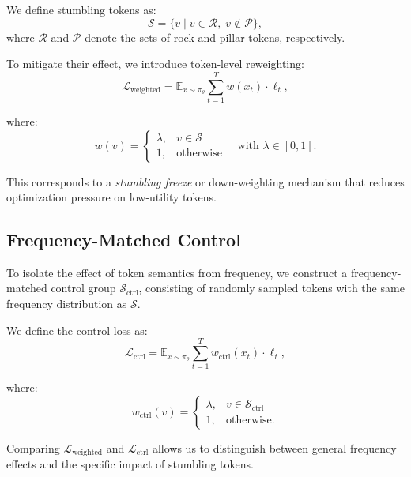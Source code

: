 \documentclass{article}
\begin{document}
We define stumbling tokens as:
\begin{equation}
\mathcal{S}
=
\{ v \mid v \in \mathcal{R}, \; v \notin \mathcal{P} \},
\end{equation}
where $\mathcal{R}$ and $\mathcal{P}$ denote the sets of rock and pillar tokens, respectively.

To mitigate their effect, we introduce token-level reweighting:
\begin{equation}
\mathcal{L}_{\text{weighted}}
=
\mathbb{E}_{x \sim \pi_\theta}
\sum_{t=1}^{T}
w(x_t)
\cdot
\ell_t,
\end{equation}

where:
\begin{equation}
w(v) =
\begin{cases}
\lambda, & v \in \mathcal{S} \\
1, & \text{otherwise}
\end{cases}
\quad \text{with } \lambda \in [0,1].
\end{equation}

This corresponds to a \textit{stumbling freeze} or down-weighting mechanism that reduces optimization pressure on low-utility tokens.

\subsection{Frequency-Matched Control}
\label{Preliminaries:Frequency-Matched Control}
To isolate the effect of token semantics from frequency, we construct a frequency-matched control group $\mathcal{S}_{\text{ctrl}}$, consisting of randomly sampled tokens with the same frequency distribution as $\mathcal{S}$.

We define the control loss as:
\begin{equation}
\mathcal{L}_{\text{ctrl}}
=
\mathbb{E}_{x \sim \pi_\theta}
\sum_{t=1}^{T}
w_{\text{ctrl}}(x_t)
\cdot
\ell_t,
\end{equation}

where:
\begin{equation}
w_{\text{ctrl}}(v) =
\begin{cases}
\lambda, & v \in \mathcal{S}_{\text{ctrl}} \\
1, & \text{otherwise}.
\end{cases}
\end{equation}

Comparing $\mathcal{L}_{\text{weighted}}$ and $\mathcal{L}_{\text{ctrl}}$ allows us to distinguish between general frequency effects and the specific impact of stumbling tokens.
\end{document}
